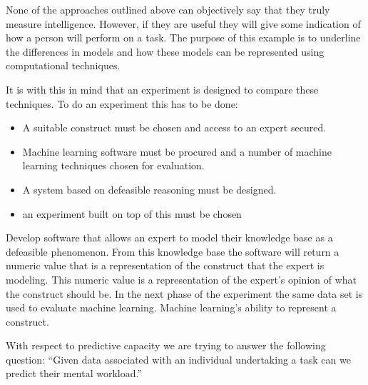 None of the approaches outlined above can objectively say that they truly measure intelligence. However, if they are useful they will give some indication of how a person will perform on a task. The purpose of this example is to underline the differences in models and how these models can be represented using computational techniques.

It is with this in mind that an experiment is designed to compare these techniques. To do an experiment this has to be done:

\begin{itemize}

  \item A suitable construct must be chosen and access to an expert secured.
  \item Machine learning software must be procured and a number of machine learning techniques chosen for evaluation.
  \item A system based on defeasible reasoning must be designed.
  \item an experiment built on top of this must be chosen 
  
\end{itemize}


Develop software that allows an expert to model their knowledge base as a defeasible phenomenon. From this knowledge base the software will return a numeric value that is a representation of the construct that the expert is modeling. This numeric value is a representation of the expert's opinion of what the construct should be.
In the next phase of the experiment the same data set is used to evaluate machine learning. Machine learning's ability to represent a construct.


With respect to predictive capacity we are trying to answer the following question: ``Given data associated with an individual undertaking a task can we predict their mental workload.''

